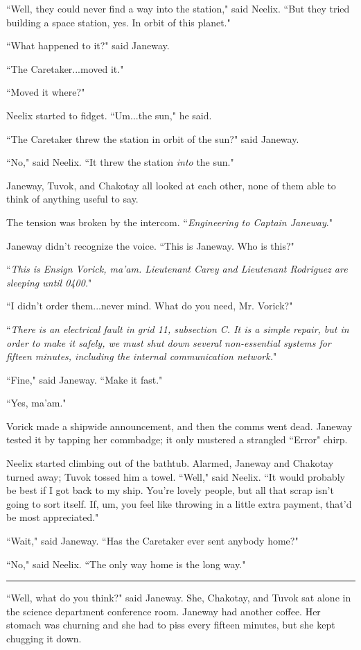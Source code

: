 \documentclass[twoside,letterpaper,12pt]{memoir}
\begin{document}
``Well, they could never find a way into the station," said Neelix. ``But they tried building a space station, yes. In orbit of this planet."

``What happened to it?" said Janeway.

``The Caretaker...moved it."

``Moved it where?"

Neelix started to fidget. ``Um...the sun," he said.

``The Caretaker threw the station in orbit of the sun?" said Janeway.

``No," said Neelix. ``It threw the station \textit{into} the sun."

Janeway, Tuvok, and Chakotay all looked at each other, none of them able to think of anything useful to say.

The tension was broken by the intercom. ``\textit{Engineering to Captain Janeway}."

Janeway didn't recognize the voice. ``This is Janeway. Who is this?"

``\textit{This is Ensign Vorick, ma'am. Lieutenant Carey and Lieutenant Rodriguez are sleeping until 0400.}"

``I didn't order them...never mind. What do you need, Mr. Vorick?"

``\textit{There is an electrical fault in grid 11, subsection C. It is a simple repair, but in order to make it safely, we must shut down several non-essential systems for fifteen minutes, including the internal communication network.}"

``Fine," said Janeway. ``Make it fast."

``Yes, ma'am."

Vorick made a shipwide announcement, and then the comms went dead. Janeway tested it by tapping her commbadge; it only mustered a strangled ``Error" chirp.

Neelix started climbing out of the bathtub. Alarmed, Janeway and Chakotay turned away; Tuvok tossed him a towel. ``Well," said Neelix. ``It would probably be best if I got back to my ship. You're lovely people, but all that scrap isn't going to sort itself. If, um, you feel like throwing in a little extra payment, that'd be most appreciated."

``Wait," said Janeway. ``Has the Caretaker ever sent anybody home?"

``No," said Neelix. ``The only way home is the long way."

\fancybreak{\rule{3cm}{0.4 pt}}
``Well, what do you think?" said Janeway. She, Chakotay, and Tuvok sat alone in the science department conference room. Janeway had another coffee. Her stomach was churning and she had to piss every fifteen minutes, but she kept chugging it down.
\end{document}
